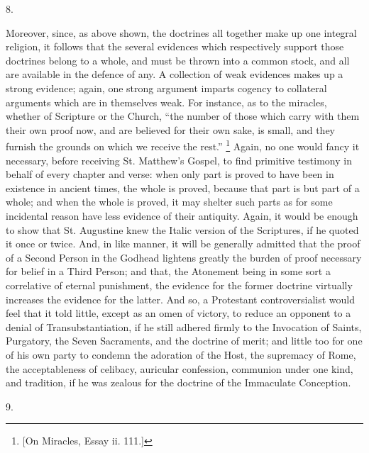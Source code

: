 8.

Moreover, since, as above shown, the doctrines all
together make up one integral religion, it follows that
the several evidences which respectively support those
doctrines belong to a whole, and must be thrown into a
common stock, and all are available in the defence of
any. A collection of weak evidences makes up a strong
evidence; again, one strong argument imparts cogency to
collateral arguments which are in themselves weak. For
instance, as to the miracles, whether of Scripture or the
Church, ``the number of those which carry with them
their own proof now, and are believed for their own sake,
is small, and they furnish the grounds on which we
receive the rest.'' \footnote{[On Miracles, Essay ii. 111.]} Again, no one would fancy it
necessary, before receiving St. Matthew's Gospel, to find
primitive testimony in behalf of every chapter and verse:
when only part is proved to have been in existence in
ancient times, the whole is proved, because that part is
but part of a whole; and when the whole is proved, it may
shelter such parts as for some incidental reason have
less evidence of their antiquity. Again, it would be
enough to show that St. Augustine knew the Italic version
of the Scriptures, if he quoted it once or twice. And, in
like manner, it will be generally admitted that the proof
of a Second Person in the Godhead lightens greatly the
burden of proof necessary for belief in a Third Person;
and that, the Atonement being in some sort a correlative
of eternal punishment, the evidence for the former
doctrine virtually increases the evidence for the latter.
And so, a Protestant controversialist would feel that it
told little, except as an omen of victory, to reduce an
opponent to a denial of Transubstantiation, if he still
adhered firmly to the Invocation of Saints, Purgatory,
the Seven Sacraments, and the doctrine of merit; and
little too for one of his own party to condemn the
adoration of the Host, the supremacy of Rome, the
acceptableness of celibacy, auricular confession,
communion under one kind, and tradition, if he was
zealous for the doctrine of the Immaculate Conception.

9.

